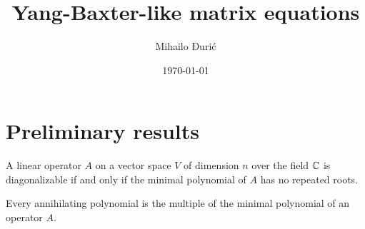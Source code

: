 \documentclass{article}
\title{Yang-Baxter-like matrix equations}
\author{Mihailo Đurić}
\date{\today}
\begin{document}
\maketitle
\tableofcontents
\newpage

\section{Preliminary results}

\begin{theorem} \label{diagonalizable}
  A linear operator $A$ on a vector space $V$ of dimension $n$ over the field $\mathbb{C}$ is diagonalizable if and only if the minimal polynomial of $A$ has no repeated roots.
\end{theorem}

\begin{theorem} \label{minimalpoly}
  Every annihilating polynomial is the multiple of the minimal polynomial of an operator $A$.
\end{theorem}
\end{document}
